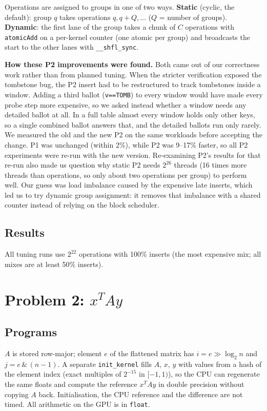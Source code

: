\documentclass[10pt,a4paper]{article}
\begin{document}
Operations are assigned to groups in one of two ways. \textbf{Static}
(cyclic, the default): group $q$ takes operations $q, q+Q, \dots$ ($Q$ =
number of groups). \textbf{Dynamic}: the first lane of the group takes a chunk
of $C$ operations with \texttt{atomicAdd} on a per-kernel counter (one atomic per
group) and broadcasts the start to the other lanes with \texttt{\_\_shfl\_sync}.

\textbf{How these P2 improvements were found.} Both came out of our correctness
work rather than from planned tuning. When the stricter verification
exposed the tombstone bug, the P2 insert had to be restructured to track
tombstones inside a window. Adding a third ballot (\texttt{v==TOMB}) to every
window would have made every probe step more expensive, so we asked instead
whether a window needs any detailed ballot at all. In a full table almost every
window holds only other keys, so a single combined ballot answers that, and the
detailed ballots run only rarely. We measured the old and the new P2 on the same
workloads before accepting the change. P1 was unchanged (within 2\%), while P2 was
9--17\% faster, so all P2 experiments were re-run with the new version. Re-examining
P2's results for that re-run also made us question why static P2 needs
$2^{26}$ threads (16 times more threads than operations, so only about two
operations per group) to perform well. Our
guess was load imbalance caused by the expensive late inserts, which led us to try
dynamic group assignment: it removes that imbalance with a shared counter instead
of relying on the block scheduler.

\subsection{Results}\label{sec:q1res}
All tuning runs use $2^{22}$ operations with 100\% inserts (the most
expensive mix; all mixes are at least 50\% inserts).


\section{Problem 2: $x^TAy$}

\subsection{Programs}
$A$ is stored row-major; element $e$ of the flattened matrix has
$i=e\gg\log_2 n$ and $j=e\,\&\,(n-1)$. A separate \texttt{init\_kernel}
fills $A$, $x$, $y$ with values from a hash of the element index (exact
multiples of $2^{-15}$ in $[-1,1)$), so the CPU can regenerate the same
floats and compute the reference $x^TAy$ in double precision without copying
$A$ back. Initialisation, the CPU reference and the difference are not
timed. All arithmetic on the GPU is in \texttt{float}.
\end{document}
